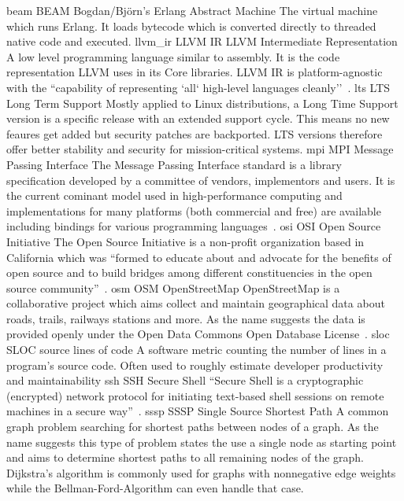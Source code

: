 \newdualentry
{beam}
{BEAM}
{Bogdan/Bj\"orn's Erlang Abstract Machine}
{The virtual machine which runs Erlang. It loads bytecode which is converted directly to threaded native code and executed.}
\newdualentry
{llvm_ir}
{LLVM IR}
{LLVM Intermediate Representation}
{A low level programming language similar to assembly. It is the code representation LLVM uses in its Core libraries. LLVM IR is platform-agnostic with the ``capability of representing `all` high-level languages cleanly''~\cite{llvm_ir_ref}.}
\newdualentry
{lts}
{LTS}
{Long Term Support}
{Mostly applied to Linux distributions, a Long Time Support version is a specific release with an extended support cycle. This means no new feaures get added but security patches are backported. LTS versions therefore offer better stability and security for mission-critical systems.}
\newdualentry
{mpi}
{MPI}
{Message Passing Interface}
{The Message Passing Interface standard is a library specification developed by a committee of vendors, implementors and users. It is the current cominant model used in high-performance computing and implementations for many platforms (both commercial and free) are available including bindings for various programming languages~\cite{mpi_main, mpi_infiniband}.}
\newdualentry
{osi}
{OSI}
{Open Source Initiative}
{The Open Source Initiative is a non-profit organization based in California which was ``formed to educate about and advocate for the benefits of open source and to build bridges among different constituencies in the open source community''~\cite{osi_about}.}
\newdualentry
{osm}
{OSM}
{OpenStreetMap}
{OpenStreetMap is a collaborative project which aims collect and maintain geographical data about roads, trails, railways stations and more. As the name suggests the data is provided openly under the Open Data Commons Open Database License~.}
\newdualentry
{sloc}
{SLOC}
{source lines of code}
{A software metric counting the number of lines in a program's source code. Often used to roughly estimate developer productivity and maintainability}
\newdualentry
{ssh}
{SSH}
{Secure Shell}
{``Secure Shell is a cryptographic (encrypted) network protocol for initiating text-based shell sessions on remote machines in a secure way''~\cite{wiki_ssh}.}
\newdualentry
{sssp}
{SSSP}
{Single Source Shortest Path}
{A common graph problem searching for shortest paths between nodes of a graph. As the name suggests this type of problem states the use a single node as starting point and aims to determine shortest paths to all remaining nodes of the graph. Dijkstra's algorithm is commonly used for graphs with nonnegative edge weights while the Bellman-Ford-Algorithm can even handle that case.}
